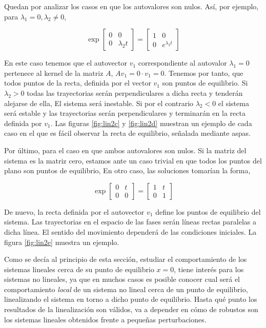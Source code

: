 Quedan por analizar los casos en que los autovalores son nulos. Así, por ejemplo, para $\lambda_1 = 0, \lambda_2 \ne 0$,  

\begin{equation}
\exp\begin{bmatrix}
0 & 0\\ 0 & \lambda_2 t
\end{bmatrix} = 
\begin{bmatrix}
1 & 0\\
0 & e^{\lambda_2 t}
\end{bmatrix}
\end{equation}

En este caso tenemos que el autovector $v_1$ correspondiente al autovalor $\lambda_1=0$ pertenece al kernel de la matriz $A$, $Av_1 = 0\cdot v_1 = 0$. Tenemos por tanto, que todos puntos de la recta, definida por el vector $v_1$ son puntos de equilibrio. Si $\lambda_2 >0$ todas las trayectorias serán perpendiculares a dicha recta y tenderán alejarse de ella, El sistema será inestable. Si por el contrario $\lambda_2 < 0 $ el sistema será estable y las trayectorias serán perpendiculares y terminarán en la recta definida por $v_1$. Las figuras \ref{fig:lin2c} y \ref{fig:lin2d} muestran un ejemplo de cada caso en el que es fácil observar la recta de equilibrio, señalada mediante aspas.

Por último, para el caso en que ambos autovalores son nulos. Si la matriz del sistema es la matriz cero, estamos ante un caso trivial en que todos los puntos del plano son puntos de equilibrio, En otro caso, las soluciones tomarían la forma,

\begin{equation}
\exp\begin{bmatrix}
0 & t\\ 0 & 0
\end{bmatrix} = 
\begin{bmatrix}
1 & t\\
0 & 1
\end{bmatrix}
\end{equation}

De nuevo, la recta definida por el autovector $v_1$ define los puntos de equilibrio del sistema. Las trayectorias en el espacio de las fases serán líneas rectas paralelas a dicha línea. El sentido del movimiento dependerá de las condiciones iniciales. La figura \ref{fig:lin2e} muestra un ejemplo.

Como se decía al principio de esta sección, estudiar el comportamiento de los sistemas lineales cerca de su punto de equilibrio $x=0$, tiene interés para los sistemas no lineales, ya que en muchos casos es posible conocer cual será el comportamiento \emph{local} de un sistema no lineal cerca de un punto de equilibrio, linealizando el sistema en torno a dicho punto de equilibrio. Hasta qué punto los resultados de la linealización son válidos, va a depender en cómo de robustos son los sistemas lineales obtenidos frente a pequeñas perturbaciones. 

